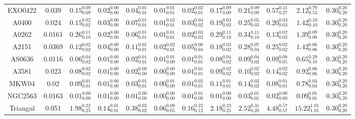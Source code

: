 \begin{table}
\begin{ruledtabular}
\begin{tabular}{c c c c c c c c c c c c}
     EXO0422 & 0.039 & $0.15^{0.09}_{0.09}$ & $0.02^{0.00}_{0.00}$ & $0.04^{0.01}_{0.01}$ & $0.01^{0.01}_{0.01}$ & $0.02^{0.02}_{0.01}$ & $0.17^{0.09}_{0.09}$ & $0.21^{0.09}_{0.09}$ & $0.57^{0.41}_{0.27}$ & $2.12^{0.79}_{0.53}$ & $0.30^{0.20}_{0.20}$ \\
     A0400 & 0.024 & $0.15^{0.02}_{0.02}$ & $0.03^{0.00}_{0.00}$ & $0.07^{0.01}_{0.01}$ & $0.01^{0.02}_{0.01}$ & $0.03^{0.04}_{0.02}$ & $0.19^{0.03}_{0.02}$ & $0.25^{0.05}_{0.03}$ & $0.20^{0.03}_{0.03}$ & $1.42^{0.10}_{0.10}$ & $0.30^{0.20}_{0.20}$ \\
     A0262 & 0.0161 & $0.26^{0.11}_{0.10}$ & $0.02^{0.00}_{0.00}$ & $0.06^{0.01}_{0.01}$ & $0.01^{0.01}_{0.01}$ & $0.02^{0.03}_{0.02}$ & $0.29^{0.11}_{0.10}$ & $0.34^{0.11}_{0.10}$ & $0.13^{0.02}_{0.02}$ & $1.39^{0.09}_{0.08}$ & $0.30^{0.20}_{0.20}$ \\
     A2151 & 0.0369 & $0.12^{0.02}_{0.02}$ & $0.04^{0.00}_{0.00}$ & $0.11^{0.01}_{0.01}$ & $0.02^{0.02}_{0.01}$ & $0.05^{0.06}_{0.04}$ & $0.18^{0.03}_{0.02}$ & $0.28^{0.07}_{0.04}$ & $0.25^{0.02}_{0.02}$ & $1.42^{0.06}_{0.06}$ & $0.30^{0.20}_{0.20}$ \\
     AS0636 & 0.0116 & $0.06^{0.04}_{0.02}$ & $0.01^{0.00}_{0.00}$ & $0.02^{0.01}_{0.01}$ & $0.01^{0.01}_{0.00}$ & $0.01^{0.01}_{0.01}$ & $0.08^{0.04}_{0.02}$ & $0.09^{0.04}_{0.02}$ & $0.09^{0.08}_{0.05}$ & $0.65^{0.29}_{0.18}$ & $0.30^{0.20}_{0.20}$ \\
     A3581 & 0.023 & $0.08^{0.02}_{0.02}$ & $0.01^{0.00}_{0.00}$ & $0.02^{0.00}_{0.00}$ & $0.00^{0.00}_{0.00}$ & $0.01^{0.01}_{0.01}$ & $0.09^{0.02}_{0.02}$ & $0.10^{0.02}_{0.02}$ & $0.14^{0.02}_{0.02}$ & $0.92^{0.06}_{0.06}$ & $0.30^{0.20}_{0.20}$ \\
     MKW04 & 0.02 & $0.09^{0.01}_{0.01}$ & $0.01^{0.00}_{0.00}$ & $0.03^{0.01}_{0.01}$ & $0.00^{0.01}_{0.00}$ & $0.01^{0.02}_{0.01}$ & $0.11^{0.01}_{0.01}$ & $0.14^{0.02}_{0.02}$ & $0.08^{0.01}_{0.01}$ & $0.78^{0.04}_{0.04}$ & $0.30^{0.20}_{0.20}$ \\
     NGC2563 & 0.0163 & $0.01^{0.00}_{0.00}$ & $0.01^{0.00}_{0.00}$ & $0.01^{0.00}_{0.00}$ & $0.00^{0.00}_{0.00}$ & $0.01^{0.01}_{0.00}$ & $0.01^{0.00}_{0.00}$ & $0.03^{0.01}_{0.01}$ & $0.02^{0.00}_{0.00}$ & $0.09^{0.01}_{0.01}$ & $0.30^{0.20}_{0.20}$ \\
     Triangul & 0.051 & $1.98^{0.22}_{0.25}$ & $0.14^{0.01}_{0.01}$ & $0.38^{0.02}_{0.02}$ & $0.06^{0.08}_{0.05}$ & $0.16^{0.22}_{0.12}$ & $2.18^{0.23}_{0.25}$ & $2.52^{0.31}_{0.28}$ & $4.48^{0.57}_{0.57}$ & $15.22^{1.01}_{1.01}$ & $0.30^{0.20}_{0.20}$ \\

\end{tabular}
\end{ruledtabular}
\end{table}
